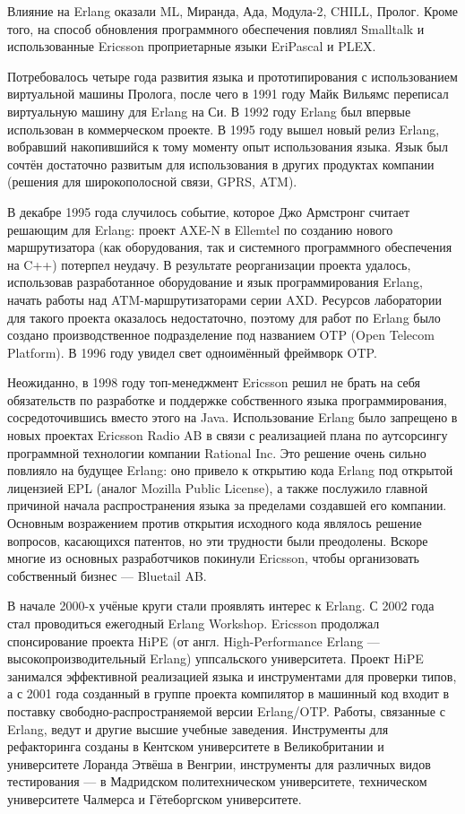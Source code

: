 \documentclass[12pt]{article}
\begin{document}
Влияние на Erlang оказали ML, Миранда, Ада, Модула-2, CHILL, Пролог. Кроме того, на способ обновления программного обеспечения повлиял Smalltalk и использованные Ericsson проприетарные языки EriPascal и PLEX.

Потребовалось четыре года развития языка и прототипирования с использованием виртуальной машины Пролога, после чего в 1991 году Майк Вильямс переписал виртуальную машину для Erlang на Си. В 1992 году Erlang был впервые использован в коммерческом проекте. В 1995 году вышел новый релиз Erlang, вобравший накопившийся к тому моменту опыт использования языка. Язык был сочтён достаточно развитым для использования в других продуктах компании (решения для широкополосной связи, GPRS, ATM).

В декабре 1995 года случилось событие, которое Джо Армстронг считает решающим для Erlang: проект AXE-N в Ellemtel по созданию нового маршрутизатора (как оборудования, так и системного программного обеспечения на C++) потерпел неудачу. В результате реорганизации проекта удалось, использовав разработанное оборудование и язык программирования Erlang, начать работы над ATM-маршрутизаторами серии AXD. Ресурсов лаборатории для такого проекта оказалось недостаточно, поэтому для работ по Erlang было создано производственное подразделение под названием OTP (Open Telecom Platform). В 1996 году увидел свет одноимённый фреймворк OTP.

Неожиданно, в 1998 году топ-менеджмент Ericsson решил не брать на себя обязательств по разработке и поддержке собственного языка программирования, сосредоточившись вместо этого на Java. Использование Erlang было запрещено в новых проектах Ericsson Radio AB в связи с реализацией плана по аутсорсингу программной технологии компании Rational Inc. Это решение очень сильно повлияло на будущее Erlang: оно привело к открытию кода Erlang под открытой лицензией EPL (аналог Mozilla Public License), а также послужило главной причиной начала распространения языка за пределами создавшей его компании. Основным возражением против открытия исходного кода являлось решение вопросов, касающихся патентов, но эти трудности были преодолены. Вскоре многие из основных разработчиков покинули Ericsson, чтобы организовать собственный бизнес — Bluetail AB.

В начале 2000-х учёные круги стали проявлять интерес к Erlang. С 2002 года стал проводиться ежегодный Erlang Workshop. Ericsson продолжал спонсирование проекта HiPE (от англ. High-Performance Erlang — высокопроизводительный Erlang) уппсальского университета. Проект HiPE занимался эффективной реализацией языка и инструментами для проверки типов, а с 2001 года созданный в группе проекта компилятор в машинный код входит в поставку свободно-распространяемой версии Erlang/OTP. Работы, связанные с Erlang, ведут и другие высшие учебные заведения. Инструменты для рефакторинга созданы в Кентском университете в Великобритании и университете Лоранда Этвёша в Венгрии, инструменты для различных видов тестирования — в Мадридском политехническом университете, техническом университете Чалмерса и Гётеборгском университете.
\end{document}
